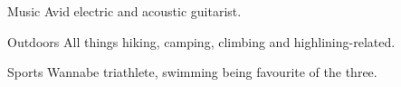 

\begin{cvskills} 

\cvskill
  {Music}
  {Avid electric and acoustic guitarist.}

\cvskill
  {Outdoors}
  {All things hiking, camping, climbing and highlining-related.}

\cvskill
  {Sports}
  {Wannabe triathlete, swimming being favourite of the three.}

\end{cvskills}